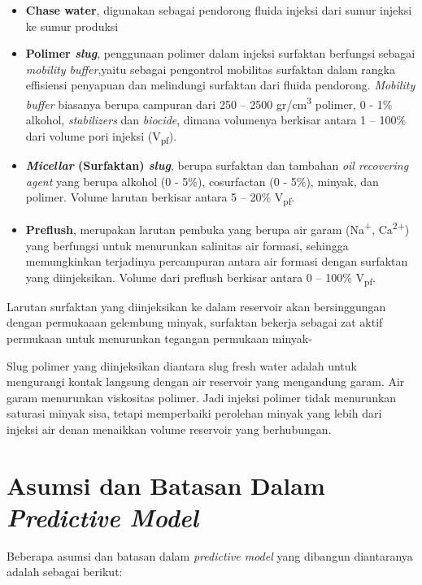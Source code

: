 \documentclass[
]{book}
\providecommand{\tightlist}{%
  \setlength{\itemsep}{0pt}\setlength{\parskip}{0pt}}
\begin{document}
\begin{itemize}
\tightlist
\item
  \textbf{Chase water}, digunakan sebagai pendorong fluida injeksi dari sumur injeksi ke sumur produksi
\item
  \textbf{Polimer \emph{slug}}, penggunaan polimer dalam injeksi surfaktan berfungsi sebagai \emph{mobility buffer},yaitu sebagai pengontrol mobilitas surfaktan dalam rangka effisiensi penyapuan dan melindungi surfaktan dari fluida pendorong. \emph{Mobility buffer} biasanya berupa campuran dari 250 -- 2500 gr/cm\textsuperscript{3} polimer, 0 - 1\% alkohol, \emph{stabilizers} dan \emph{biocide}, dimana volumenya berkisar antara 1 -- 100\% dari volume pori injeksi (V\textsubscript{pf}).
\item
  \textbf{\emph{Micellar} (Surfaktan) \emph{slug}}, berupa surfaktan dan tambahan \emph{oil recovering agent} yang berupa alkohol (0 - 5\%), cosurfactan (0 - 5\%), minyak, dan polimer. Volume larutan berkisar antara 5 -- 20\% V\textsubscript{pf}.
\item
  \textbf{Preflush}, merupakan larutan pembuka yang berupa air garam (Na\textsuperscript{+}, Ca\textsuperscript{2+}) yang berfungsi untuk menurunkan salinitas air formasi, sehingga memungkinkan terjadinya percampuran antara air formasi dengan surfaktan yang diinjeksikan. Volume dari preflush berkisar antara 0 -- 100\% V\textsubscript{pf}.
\end{itemize}

Larutan surfaktan yang diinjeksikan ke dalam reservoir akan bersinggungan dengan permukaaan gelembung minyak, surfaktan bekerja sebagai zat aktif permukaan untuk menurunkan tegangan permukaan minyak-

Slug polimer yang diinjeksikan diantara slug fresh water adalah untuk mengurangi kontak langsung dengan air reservoir yang mengandung garam. Air garam menurunkan viskositas polimer. Jadi injeksi polimer tidak menurunkan saturasi minyak sisa, tetapi memperbaiki perolehan minyak yang lebih dari injeksi air denan menaikkan volume reservoir yang berhubungan.

\hypertarget{asumsi-dan-batasan-dalam-predictive-model}{%
\section{\texorpdfstring{Asumsi dan Batasan Dalam \emph{Predictive Model}}{Asumsi dan Batasan Dalam Predictive Model}}\label{asumsi-dan-batasan-dalam-predictive-model}}

Beberapa asumsi dan batasan dalam \emph{predictive model} yang dibangun diantaranya adalah sebagai berikut:
\end{document}
